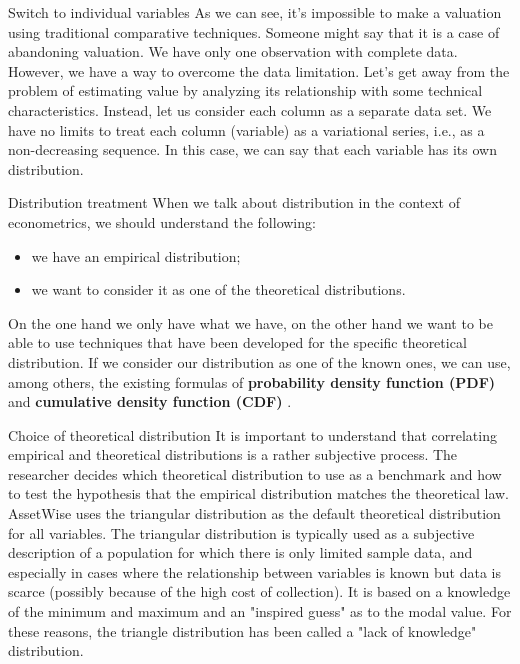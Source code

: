 \documentclass{beamer}
\begin{document}
\begin{frame}{Switch to individual variables}
	As we can see, it's impossible to make a valuation using traditional comparative techniques. Someone might say that it is a case of abandoning valuation. We have only one observation with complete data. However, we have a way to overcome the data limitation. Let's get away from the problem of estimating value by analyzing its relationship with some technical characteristics. Instead, let us consider each column as a separate data set. We have no limits to treat each column (variable) as a variational series, i.e., as a non-decreasing sequence. In this case, we can say that each variable has its own distribution.
\end{frame}

\begin{frame}{Distribution treatment}
	When we talk about distribution in the context of econometrics, we should understand the following:
	\begin{itemize}
		\item we have an empirical distribution;
		\item we want to consider it as one of the theoretical distributions.
	\end{itemize}
    On the one hand we only have what we have, on the other hand we want to be able to use techniques that have been developed for the specific theoretical distribution. If we consider our distribution as one of the known ones, we can use, among others, the existing formulas of \textbf{probability density function (PDF)} \cite{wiki:PDF} and \textbf{cumulative density function (CDF)} \cite{wiki:CDF}.    
    \end{frame}

\begin{frame}{Choice of theoretical distribution}
	It is important to understand that correlating empirical and theoretical distributions is a rather subjective process. The researcher decides which theoretical distribution to use as a benchmark and how to test the hypothesis that the empirical distribution matches the theoretical law. AssetWise uses the triangular distribution \cite{wiki:triangular_dist} as the default theoretical distribution for all variables. The triangular distribution is typically used as a subjective description of a population for which there is only limited sample data, and especially in cases where the relationship between variables is known but data is scarce (possibly because of the high cost of collection). It is based on a knowledge of the minimum and maximum and an "inspired guess" as to the modal value. For these reasons, the triangle distribution has been called a "lack of knowledge" distribution.
\end{frame}
\end{document}
